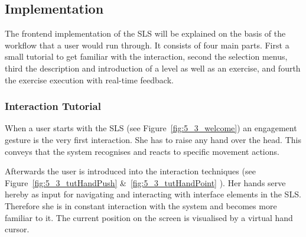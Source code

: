 

\subsection{Implementation}
The frontend implementation of the SLS will be explained on the basis of the workflow that a user would run through. It consists of four main parts. First a small tutorial to get familiar with the interaction,  second the selection menus, third the description and introduction of a level as well as an exercise, and fourth the exercise execution with real-time feedback. 

\subsubsection{Interaction Tutorial}
When a user starts with the SLS (see Figure~\ref{fig:5_3_welcome}) an engagement gesture is the very first interaction. She has to raise any hand over the head. This conveys that the system recognises and reacts to specific movement actions. 

Afterwards the user is introduced into the interaction techniques (see Figure~\ref{fig:5_3_tutHandPush} \&~\ref{fig:5_3_tutHandPoint} ).
Her hands serve hereby as input for navigating and interacting with interface elements in the SLS. Therefore she is in constant interaction with the system and becomes more familiar to it.
The current position on the screen is visualised by a virtual hand cursor.

